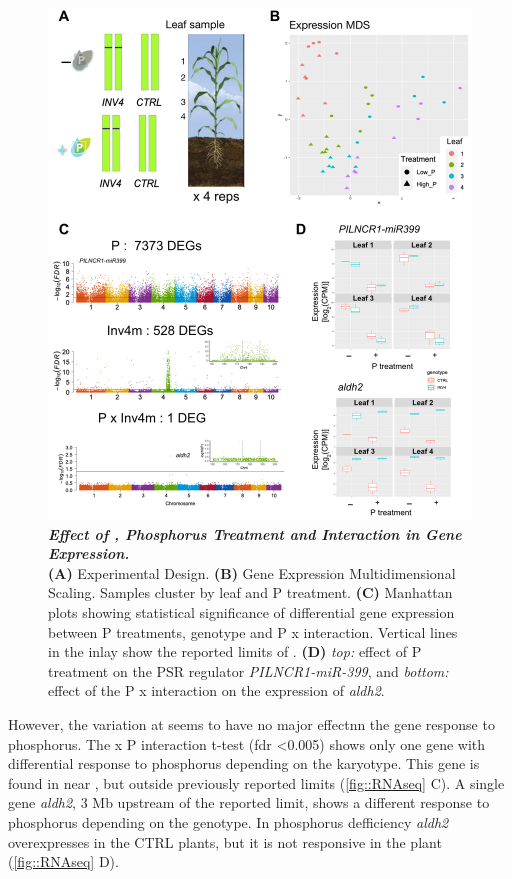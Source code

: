 \begin{figure}[!ht]
\centering
\includegraphics[width=0.95\linewidth]{Chapter-3/figs/RNAseq.png}
\caption[Effect of \invfour, Phosphorus Treatment and Interaction in Gene Expression]{\textit{\textbf{Effect of \invfour, Phosphorus Treatment and Interaction in Gene Expression.}}\\
\hspace{\textwidth} 
\textbf{(A)} Experimental Design.
\textbf{(B)} Gene Expression Multidimensional Scaling. Samples cluster by leaf and P treatment.
\textbf{(C)} Manhattan plots showing statistical significance of differential gene expression between P treatments, \textit{\invfour} genotype and P x \invfour interaction. Vertical lines in the inlay show the reported limits of \invfour \citep{calfee2021-mr}.
\textbf{(D)} \textit{top:} effect of P treatment on the PSR regulator \textit{PILNCR1-miR-399}, and \textit{bottom:} effect of the P x \invfour interaction on the expression of \textit{aldh2}.}
\label{fig::RNAseq}
\end{figure}
\clearpage

However, the variation at \invfour seems to have no major effectnn the gene response to phosphorus.
The \invfour x P interaction t-test (fdr <0.005) shows only one gene with differential response to phosphorus depending on the \invfour karyotype. This gene is found in  near \invfour, but outside previously reported limits (\autoref{fig::RNAseq} C).
A single gene \textit{aldh2}, 3 Mb upstream of the reported \invfour limit,  shows a different response  to phosphorus depending on the \invfour genotype. In phosphorus defficiency \textit{aldh2} overexpresses in  the CTRL plants, but it is not responsive in the \invfour plant (\autoref{fig::RNAseq} D).



